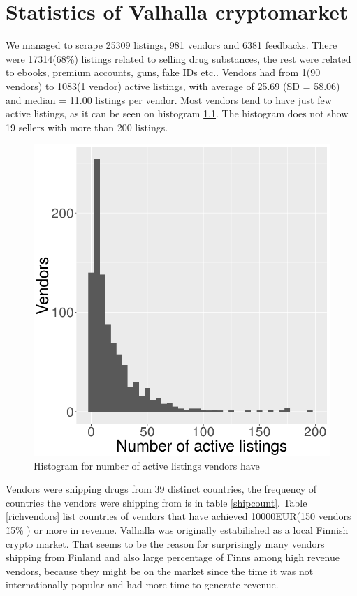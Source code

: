 \documentclass[
  digital, %
  table,   %
  lof,     %
  lot,     %
  oneside
]{fithesis3}
\begin{document}
\chapter{Statistics of Valhalla cryptomarket}

We managed to scrape 25309 listings, 981 vendors and 6381 feedbacks.
There were 17314(68\%) listings related to selling drug substances, the rest
were related to ebooks, premium accounts, guns, fake IDs etc..
Vendors had from 1(90 vendors) to 1083(1 vendor)
active listings, with average of 25.69 (SD = 58.06)
and median = 11.00 listings per vendor.
Most vendors tend to have just few active listings,
as it can be seen on histogram \ref{listingsxsellers}.
The histogram does not show 19 sellers with more than 200 listings.

\begin{figure}[!htb]
    \centering
    \includegraphics[scale=0.6]{listingsxsellers}
    \centering
    \caption{Histogram for number of active listings vendors have}
    \label{listingsxsellers}
\end{figure}

Vendors were shipping drugs from 39 distinct countries,
the frequency of countries the vendors were shipping from is in table \ref{shipcount}.
Table \ref{richvendors} list countries of vendors that have achieved 10000EUR(150 vendors \~ 15\% ) or more in revenue.
Valhalla was originally estabilished as a local Finnish crypto market.
That seems to be the reason for surprisingly many vendors shipping from Finland and also large percentage
of Finns among high revenue vendors, because they might be on the market since
the time it was not internationally popular and had more time to generate revenue.
\end{document}
